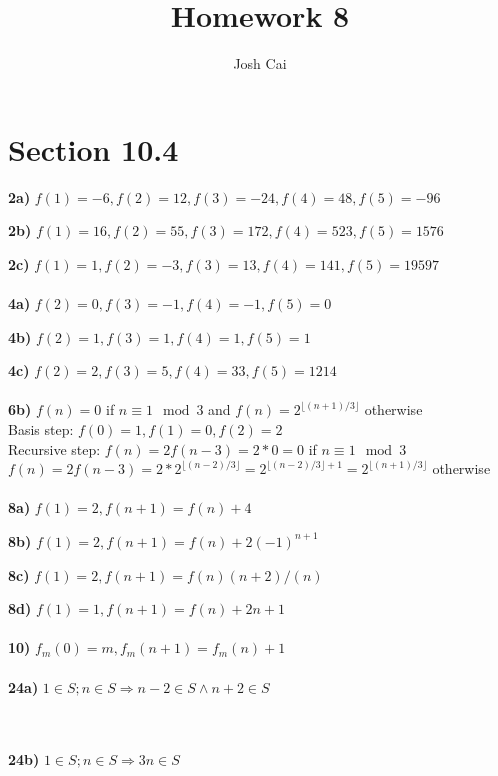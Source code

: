 \documentclass{article}
\begin{document}
\title{Homework 8}
\author{Josh Cai}

\maketitle
\section*{Section 10.4}

\textbf{2a)} $f(1) = -6, f(2) = 12, f(3) = -24, f(4) = 48, f(5) = -96$

\noindent\textbf{2b)} $f(1) = 16, f(2) = 55, f(3) = 172, f(4) = 523, f(5) = 1576$

\noindent\textbf{2c)} $f(1) = 1, f(2) = -3, f(3) = 13, f(4) = 141, f(5) = 19597$
\\\\\noindent\textbf{4a)} $f(2) = 0, f(3) = -1, f(4) = -1, f(5) = 0$

\noindent\textbf{4b)} $f(2) = 1, f(3) = 1, f(4) = 1, f(5) = 1$

\noindent\textbf{4c)} $f(2) = 2, f(3) = 5, f(4) = 33, f(5) = 1214$
\\\\\noindent\textbf{6b)} $f(n) = 0$ if $n \equiv 1 \mod{3}$ and $f(n) = 2^{\lfloor (n+1)/3 \rfloor}$ otherwise
\\Basis step: $f(0) = 1, f(1) = 0, f(2) = 2$
\\Recursive step: $f(n) = 2f(n-3) = 2*0 = 0$ if $n \equiv 1 \mod{3}$
\\$f(n) = 2f(n-3) = 2*2^{\lfloor (n-2)/3 \rfloor} = 2^{\lfloor (n-2)/3 \rfloor+1} = 2^{\lfloor (n+1)/3 \rfloor}$ otherwise
\\\\\noindent\textbf{8a)} $f(1) = 2, f(n+1) = f(n)+4$

\noindent\textbf{8b)} $f(1) = 2, f(n+1) = f(n)+2(-1)^{n+1}$

\noindent\textbf{8c)} $f(1) = 2, f(n+1) = f(n)(n+2)/(n)$

\noindent\textbf{8d)} $f(1) = 1, f(n+1) = f(n)+2n+1$
\\\\\noindent\textbf{10)} $f_m(0)=m, f_m(n+1) = f_m(n)+1$
\\\\\noindent\textbf{24a)} $1\in S; n\in S \Rightarrow n-2\in S \wedge n+2 \in S$

\\\\\noindent\textbf{24b)} $1\in S; n\in S \Rightarrow 3n\in S$
\end{document}
